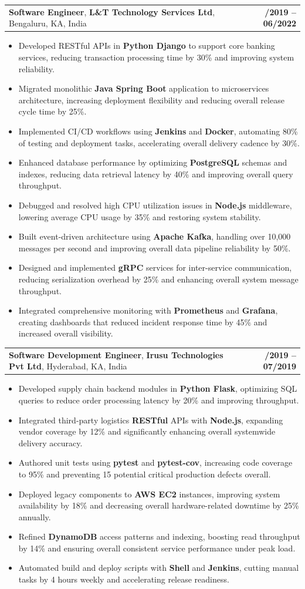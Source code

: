 \documentclass[letterpaper,11pt]{article}
\makeatletter
\newcommand{\resumeItem}[1]{
  \item\footnotesize{
    {#1 \vspace{-2pt}}
  }
}
\newcommand{\resumeSubheading}[4]{
  \vspace{-2pt}\item
    \begin{tabular*}{1.0\textwidth}[t]{l@{\extracolsep{\fill}}r}
      \textbf{\fontsize{10pt}{14pt}\selectfont #3}, \textbf{\fontsize{10pt}{14pt}\selectfont #1}, \fontsize{10pt}{14pt}\selectfont #4 & \textbf{\fontsize{10pt}{14pt}\selectfont #2} \\
    \end{tabular*}\vspace{-7pt}
}
\newcommand{\resumeItemListStart}{\begin{itemize}[leftmargin=*]}
\newcommand{\resumeItemListEnd}{\end{itemize}\vspace{-5pt}}
\makeatother
\begin{document}
    \resumeSubheading
        {L\&T Technology Services Ltd}{08/2019 -- 06/2022}
        {Software Engineer}{Bengaluru, KA, India}
      \resumeItemListStart
        \resumeItem{Developed RESTful APIs in \textbf{Python Django} to support core banking services, reducing transaction processing time by 30\% and improving system reliability.}
        \resumeItem{Migrated monolithic \textbf{Java Spring Boot} application to microservices architecture, increasing deployment flexibility and reducing overall release cycle time by 25\%.}
        \resumeItem{Implemented CI/CD workflows using \textbf{Jenkins} and \textbf{Docker}, automating 80\% of testing and deployment tasks, accelerating overall delivery cadence by 30\%.}
        \resumeItem{Enhanced database performance by optimizing \textbf{PostgreSQL} schemas and indexes, reducing data retrieval latency by 40\% and improving overall query throughput.}
        \resumeItem{Debugged and resolved high CPU utilization issues in \textbf{Node.js} middleware, lowering average CPU usage by 35\% and restoring system stability.}
        \resumeItem{Built event-driven architecture using \textbf{Apache Kafka}, handling over 10,000 messages per second and improving overall data pipeline reliability by 50\%.}
        \resumeItem{Designed and implemented \textbf{gRPC} services for inter-service communication, reducing serialization overhead by 25\% and enhancing overall system message throughput.}
        \resumeItem{Integrated comprehensive monitoring with \textbf{Prometheus} and \textbf{Grafana}, creating dashboards that reduced incident response time by 45\% and increased overall visibility.}
      \resumeItemListEnd

    \resumeSubheading
        {Irusu Technologies Pvt Ltd}{01/2019 -- 07/2019}
        {Software Development Engineer}{Hyderabad, KA, India}
      \resumeItemListStart
        \resumeItem{Developed supply chain backend modules in \textbf{Python Flask}, optimizing SQL queries to reduce order processing latency by 20\% and improving throughput.}
        \resumeItem{Integrated third-party logistics \textbf{RESTful} APIs with \textbf{Node.js}, expanding vendor coverage by 12\% and significantly enhancing overall systemwide delivery accuracy.}
        \resumeItem{Authored unit tests using \textbf{pytest} and \textbf{pytest-cov}, increasing code coverage to 95\% and preventing 15 potential critical production defects overall.}
        \resumeItem{Deployed legacy components to \textbf{AWS EC2} instances, improving system availability by 18\% and decreasing overall hardware-related downtime by 25\% annually.}
        \resumeItem{Refined \textbf{DynamoDB} access patterns and indexing, boosting read throughput by 14\% and ensuring overall consistent service performance under peak load.}
        \resumeItem{Automated build and deploy scripts with \textbf{Shell} and \textbf{Jenkins}, cutting manual tasks by 4 hours weekly and accelerating release readiness.}
      \resumeItemListEnd
\end{document}
